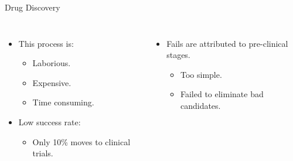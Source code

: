 \begin{frame}{Drug Discovery}
    \begin{columns}
            \begin{itemize}
                \item<1-> This process is:
                \begin{itemize}
                    \item<2-> Laborious.
                    \item<3-> Expensive.
                    \item<4-> Time consuming.
                \end{itemize}
                \item<5-> Low success rate:
                \begin{itemize}
                    \item<6-> Only \alert{10\%} moves to clinical trials.
                \end{itemize}
            \end{itemize}
            \begin{itemize}
                \item<7-> Fails are attributed to \alert{pre-clinical} stages.
                \begin{itemize}
                    \item<8-> Too simple.
                    \item<9-> Failed to eliminate bad candidates.
                \end{itemize}
            \end{itemize}
    \end{columns}
\end{frame}


